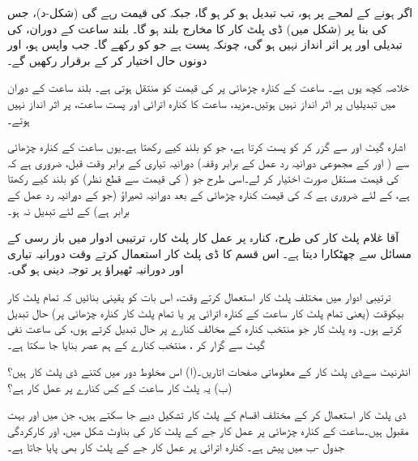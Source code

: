  اگر   ہونے کے لمحے پر   ہو، تب  تبدیل ہو کر  ہو گا، جبکہ  کی قیمت  رہے گی    (شکل-د)، جس کی بنا پر  (شکل  میں)     ڈی پلٹ کار کا مخارج  بلند  ہو گا۔ بلند ساعت  کے دوران،  کی تبدیلی        اور  پر اثر انداز  نہیں ہو گی، چونکہ    پست   ہے جو    کو   رکھے گا۔  جب  واپس   ہو،  اور  دونوں   حال اختیار کر کے  برقرار رکھیں گے۔
 
 خلاصہ کچھ یوں ہے۔ ساعت کے کنارہ چڑھائی پر  کی قیمت  کو منتقل ہوتی ہے۔ بلند ساعت  کے دوران  میں تبدیلیاں  پر اثر انداز نہیں ہوتیں۔مزید، ساعت  کا کنارہ اترائی   اور پست ساعت،        پر اثر انداز نہیں ہوتے۔
 
  اشارہ     گیٹ  اور  سے گزر کر     کو پست کرتا ہے،  جو    کو  بلند کیے رکھتا ہے۔یوں ساعت کے کنارہ چڑھائی سے   ( اور   کے مجموعی دورانیہ رد عمل کے برابر وقفہ)  دورانیہ تیاری کے برابر وقت  قبل،    ضروری ہے کہ  کی قیمت  مستقل صورت اختیار کر لے۔اسی طرح   جو ( کی قیمت سے قطع نظر)   کو بلند کیے رکھتا ہے،  کے لئے ضروری ہے کہ  کی قیمت کنارہ چڑھائی کے بعد دورانیہ ٹھیراؤ  (جو  کے دورانیہ رد عمل کے برابر  ہے)   کے لئے تبدیل نہ ہو۔
  
     آقا غلام پلٹ کار کی طرح،  کنارہ پر عمل کار پلٹ کار، ترتیبی ادوار میں  باز رسی کے مسائل سے چھٹکارا دیتا ہے۔ اس قسم کا   ڈی پلٹ کار استعمال کرتے وقت  دورانیہ تیاری اور دورانیہ ٹھیراؤ پر توجہ دینی ہو گی۔   

ترتیبی ادوار میں مختلف پلٹ کار استعمال کرتے وقت،  اس بات کو یقینی بنائیں کہ  تمام پلٹ کار بیکوقت (یعنی  تمام پلٹ کار ساعت کے کنارہ اترائی پر   یا تمام پلٹ کار  کنارہ  چڑھائی پر) حال تبدیل کرتے  ہوں۔ وہ پلٹ کار جو منتخب کنارہ کے مخالف کنارے پر حال تبدیل کرتے  ہوں، کی ساعت نفی گیٹ سے گزار  کر ،   منتخب کنارے کے ہم  عصر بنایا جا سکتا ہے۔


انٹرنیٹ سےڈی پلٹ کار کے معلوماتی  صفحات  اتاریں۔(ا) اس مخلوط دور  میں کتنے   ڈی پلٹ کار ہیں؟ (ب)  یہ پلٹ کار ساعت کے کس کنارے  پر  عمل کار ہے؟


ڈی پلٹ کار استعمال  کر کے  مختلف اقسام کے     پلٹ کار  تشکیل دیے   جا سکتے     ہیں،  جن میں    اور    بہت  مقبول ہیں۔ساعت کے کنارہ چڑھائی پر عمل کار جے کے پلٹ کار کی بناوٹ  شکل  میں، اور کارکردگی جدول -ب  میں   پیش ہے۔ کنارہ اترائی پر عمل کار جے کے پلٹ کار بھی   پایا جاتا  ہے۔

